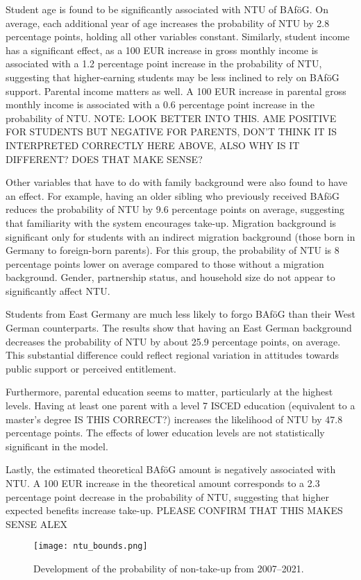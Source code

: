 Student age is found to be significantly associated with NTU of BAföG. On average, each additional year of age increases the probability of NTU by 2.8 percentage points, holding all other variables constant. Similarly, student income has a significant effect, as a 100 EUR increase in gross monthly income is associated with a 1.2 percentage point increase in the probability of NTU, suggesting that higher-earning students may be less inclined to rely on BAföG support. Parental income matters as well. A 100 EUR increase in parental gross monthly income is associated with a 0.6 percentage point increase in the probability of NTU. NOTE: LOOK BETTER INTO THIS. AME POSITIVE FOR STUDENTS BUT NEGATIVE FOR PARENTS, DON’T THINK IT IS INTERPRETED CORRECTLY HERE ABOVE, ALSO WHY IS IT DIFFERENT? DOES THAT MAKE SENSE?

Other variables that have to do with family background were also found to have an effect. For example, having an older sibling who previously received BAföG reduces the probability of NTU by 9.6 percentage points on average, suggesting that familiarity with the system encourages take-up. Migration background is significant only for students with an indirect migration background (those born in Germany to foreign-born parents). For this group, the probability of NTU is 8 percentage points lower on average compared to those without a migration background.  Gender, partnership status, and household size do not appear to significantly affect NTU.

Students from East Germany are much less likely to forgo BAföG than their West German counterparts. The results show that having an East German background decreases the probability of NTU by about 25.9 percentage points, on average. This substantial difference could reflect regional variation in attitudes towards public support or perceived entitlement.

Furthermore, parental education seems to matter, particularly at the highest levels. Having at least one parent with a level 7 ISCED education (equivalent to a master’s degree IS THIS CORRECT?) increases the likelihood of NTU by 47.8 percentage points. The effects of lower education levels are not statistically significant in the model.

Lastly, the estimated theoretical BAföG amount is negatively associated with NTU. A 100 EUR increase in the theoretical amount corresponds to a 2.3 percentage point decrease in the probability of NTU, suggesting that higher expected benefits increase take-up. PLEASE CONFIRM THAT THIS MAKES SENSE ALEX

\begin{figure}[htbp]
  \centering
  \texttt{[image: ntu\_bounds.png]}
  \caption{Development of the probability of non-take-up from 2007--2021.}
  \label{fig:ntu_bounds_over_years}
\end{figure}


